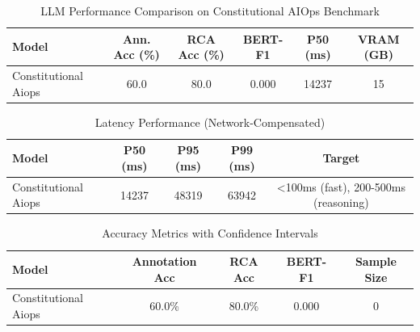 

\begin{table}[h]
\centering
\caption{LLM Performance Comparison on Constitutional AIOps Benchmark}
\label{tab:llm-comparison}
\begin{tabular}{lccccc}
\toprule
\textbf{Model} & \textbf{Ann. Acc (\%)} & \textbf{RCA Acc (\%)} & \textbf{BERT-F1} & \textbf{P50 (ms)} & \textbf{VRAM (GB)} \\
\midrule
Constitutional Aiops & 60.0 & 80.0 & 0.000 & 14237 & 15 \\

\bottomrule
\end{tabular}
\end{table}



\begin{table}[h]
\centering
\caption{Latency Performance (Network-Compensated)}
\label{tab:latency}
\begin{tabular}{lcccc}
\toprule
\textbf{Model} & \textbf{P50 (ms)} & \textbf{P95 (ms)} & \textbf{P99 (ms)} & \textbf{Target} \\
\midrule
Constitutional Aiops & 14237 & 48319 & 63942 & <100ms (fast), 200-500ms (reasoning) \\

\bottomrule
\end{tabular}
\end{table}



\begin{table}[h]
\centering
\caption{Accuracy Metrics with Confidence Intervals}
\label{tab:accuracy}
\begin{tabular}{lcccc}
\toprule
\textbf{Model} & \textbf{Annotation Acc} & \textbf{RCA Acc} & \textbf{BERT-F1} & \textbf{Sample Size} \\
\midrule
Constitutional Aiops & 60.0\% & 80.0\% & 0.000 & 0 \\

\bottomrule
\end{tabular}
\end{table}

